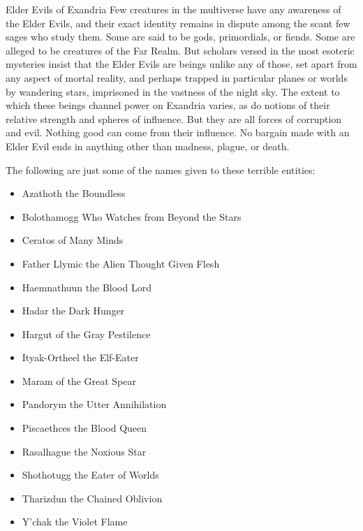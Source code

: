 \documentclass[10pt,a4paper,twoside,bg=print,twocolumn,openany,nodeprecatedcode]{dndbook}
\begin{document}
\begin{DndSidebar}[float=!b]{Elder Evils of Exandria}
Few creatures in the multiverse have any awareness of the Elder Evils, and their exact identity remains in dispute among the scant few sages who study them. Some are said to be gods, primordials, or fiends. Some are alleged to be creatures of the Far Realm. But scholars versed in the most esoteric mysteries insist that the Elder Evils are beings unlike any of those, set apart from any aspect of mortal reality, and perhaps trapped in particular planes or worlds by wandering stars, imprisoned in the vastness of the night sky. The extent to which these beings channel power on Exandria varies, as do notions of their relative strength and spheres of influence. But they are all forces of corruption and evil. Nothing good can come from their influence. No bargain made with an Elder Evil ends in anything other than madness, plague, or death.



The following are just some of the names given to these terrible entities:




\begin{itemize}
\item Azathoth the Boundless
\item Bolothamogg Who Watches from Beyond the Stars
\item Ceratos of Many Minds
\item Father Llymic the Alien Thought Given Flesh
\item Haemnathuun the Blood Lord
\item Hadar the Dark Hunger
\item Hargut of the Gray Pestilence
\item Ityak-Ortheel the Elf-Eater
\item Maram of the Great Spear
\item Pandorym the Utter Annihilation
\item Piscaethces the Blood Queen
\item Rasalhague the Noxious Star
\item Shothotugg the Eater of Worlds
\item Tharizdun the Chained Oblivion
\item Y'chak the Violet Flame
\end{itemize}



\end{DndSidebar}
\end{document}

